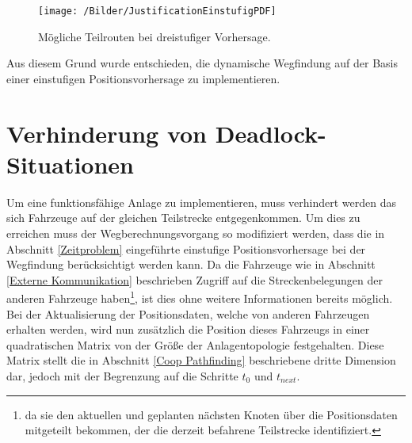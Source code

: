 		\begin{figure}[h]
			\centering
			\texttt{[image: /Bilder/JustificationEinstufigPDF]}
			\vspace{0.2cm}
			\caption{Mögliche Teilrouten bei dreistufiger Vorhersage.}\label{Einstufig}
		\end{figure}
		
		Aus diesem Grund wurde entschieden, die dynamische Wegfindung auf der Basis einer einstufigen Positionsvorhersage zu implementieren.
		
\section{Verhinderung von Deadlock-Situationen}
	\label{Deadlock Verhindern}
	Um eine funktionsfähige Anlage zu implementieren, muss verhindert werden das sich Fahrzeuge auf der gleichen Teilstrecke entgegenkommen. Um dies zu erreichen muss der Wegberechnungsvorgang so modifiziert werden, dass die in Abschnitt \ref{Zeitproblem} eingeführte einstufige Positionsvorhersage bei der Wegfindung berücksichtigt werden kann. Da die Fahrzeuge wie in Abschnitt \ref{Externe Kommunikation} beschrieben Zugriff auf die Streckenbelegungen der anderen Fahrzeuge haben\footnote{da sie den aktuellen und geplanten nächsten Knoten über die Positionsdaten mitgeteilt bekommen, der die derzeit befahrene Teilstrecke identifiziert.}, ist dies ohne weitere Informationen bereits möglich. Bei der Aktualisierung der Positionsdaten, welche von anderen Fahrzeugen erhalten werden, wird nun zusätzlich die Position dieses Fahrzeugs in einer quadratischen Matrix von der Größe der Anlagentopologie festgehalten. Diese Matrix stellt die in Abschnitt \ref{Coop Pathfinding} beschriebene dritte Dimension dar, jedoch mit der Begrenzung auf die Schritte $t_0$ und $t_{next}$.

